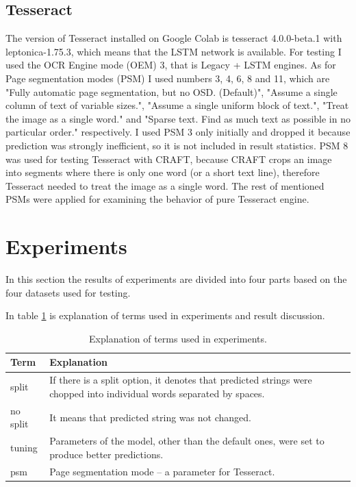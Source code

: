 
\subsection*{Tesseract}
The version of Tesseract installed on Google Colab is tesseract 4.0.0-beta.1 with leptonica-1.75.3, which means that the LSTM network is available. For testing I used the OCR Engine mode (OEM) 3, that is Legacy + LSTM engines. As for Page segmentation modes (PSM) I used numbers 3, 4, 6, 8 and 11, which are "Fully automatic page segmentation, but no OSD. (Default)", "Assume a single column of text of variable sizes.",  "Assume a single uniform block of text.",  "Treat the image as a single word." and "Sparse text. Find as much text as possible in no particular order." respectively. I used PSM 3 only initially and dropped it because prediction was strongly inefficient, so it is not included in result statistics. PSM 8 was used for testing Tesseract with CRAFT, because CRAFT crops an image into segments where there is only one word (or a short text line), therefore Tesseract needed to treat the image as a single word. The rest of mentioned PSMs were applied for examining the behavior of pure Tesseract engine. 

\section*{Experiments}

In this section the results of experiments are divided into four parts based on the four datasets used for testing.

In table \ref{Tab:terms} is explanation of terms used in experiments and result discussion.

\begin{table}[!hbt]
    \centering
    \begin{tabular}{|p{2cm}|p{\textwidth-3cm}|}
    \hline
        Term & Explanation \\
    \hline
        split & If there is a split option, it denotes that predicted strings were chopped into individual words separated by spaces. \\
        no split & It means that predicted string was not changed. \\
        tuning & Parameters of the model, other than the default ones, were set to produce better predictions. \\
        psm & Page segmentation mode -- a parameter for Tesseract. \\
    \hline
    \end{tabular}
    \caption{Explanation of terms used in experiments.}
    \label{Tab:terms}
\end{table}

